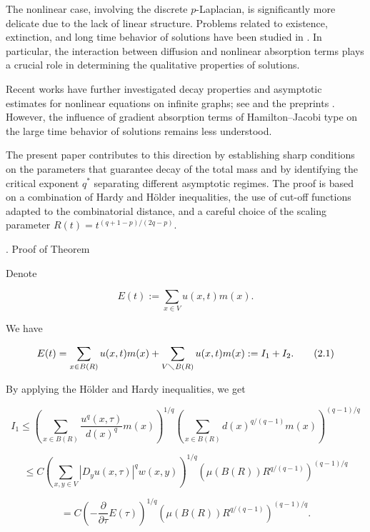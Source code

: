 \documentclass{article}
\begin{document}
	The nonlinear case, involving the discrete $p$-Laplacian, is significantly more delicate due to the lack of linear structure. Problems related to existence, extinction, and long time behavior of solutions have been studied in \cite{mugnolo, hua, xin, lee, chung2014}. In particular, the interaction between diffusion and nonlinear absorption terms plays a crucial role in determining the qualitative properties of solutions.
	
	Recent works have further investigated decay properties and asymptotic estimates for nonlinear equations on infinite graphs; see \cite{andreucci2020} and the preprints \cite{tedeev_decay, tedeev_density}. However, the influence of gradient absorption terms of Hamilton--Jacobi type on the large time behavior of solutions remains less understood.
	
	The present paper contributes to this direction by establishing sharp conditions on the parameters that guarantee decay of the total mass and by identifying the critical exponent $q^*$ separating different asymptotic regimes. The proof is based on a combination of Hardy and Hölder inequalities, the use of cut-off functions adapted to the combinatorial distance, and a careful choice of the scaling parameter $R(t)=t^{(q+1-p)/(2q-p)}$.
	
	
	
	. Proof of Theorem
	
	Denote
	
	\[
	E(t):=\sum\limits_{x\in V}u(x,t)m(x).
	\]
	
	We have
	
	\begin{equation}
		E(t)=\sum\limits_{x\in B(R)}u(x,t)m(x)+\sum\limits_{V\diagdown
			B(R)}u(x,t)m(x):=I_{1}+I_{2}.  \tag{2.1}
	\end{equation}
	
	By applying the Hölder and Hardy inequalities, we get
	
	\[
	I_{1}\leq \left( \sum\limits_{x\in B(R)}\frac{u^{q}(x,\tau )}{d(x)^{q}}
	m(x)\right) ^{1/q}\left( \sum\limits_{x\in B(R)}d(x)^{q/(q-1)}m(x)\right)
	^{(q-1)/q}
	\]
	
	\[
	\leq C\left( \sum\limits_{x,y\in V}\left\vert D_{y}u(x,\tau )\right\vert
	^{q}w(x,y)\right) ^{1/q}\left( \mu (B(R))R^{q/(q-1)}\right) ^{(q-1)/q}
	\]
	
	\begin{equation}
		=C\left( -\frac{\partial }{\partial \tau }E(\tau )\right) ^{1/q}\left( \mu
		(B(R))R^{q/(q-1)}\right) ^{(q-1)/q}.  \tag{2.2}
	\end{equation}
	
\end{document}
